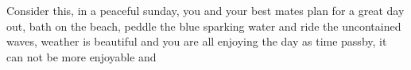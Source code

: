Consider this, in a peaceful sunday, you and your best mates plan for a great day out, bath on the beach, peddle the blue sparking water and ride the uncontained waves, weather is beautiful and you are all enjoying the day as time passby, it can not be more enjoyable and 